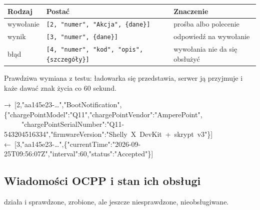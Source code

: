 \documentclass[11pt,a4paper]{article}
\begin{document}
\begin{longtable}{>{\raggedright\arraybackslash}p{3.00cm}>{\raggedright\arraybackslash}p{6.81cm}>{\raggedright\arraybackslash}p{5.47cm}}
\toprule
\rowcolor{apteallight}\textbf{Rodzaj} & \textbf{Postać} & \textbf{Znaczenie} \\
\midrule\endhead
\bottomrule\endfoot
wywołanie & \texttt{[2, "numer", "Akcja", \{dane\}]} & prośba albo polecenie \\
wynik & \texttt{[3, "numer", \{dane\}]} & odpowiedź na wywołanie \\
błąd & \texttt{[4, "numer", "kod", "opis", \{szczegóły\}]} & wywołania nie da się obsłużyć \\
\end{longtable}

Prawdziwa wymiana z testu: ładowarka się przedstawia, serwer ją przyjmuje i każe dawać znak życia co 60 sekund.


\begin{kodbox}
{\symbolfont→}\ [2,"aa145e23-…","BootNotification",\{"chargePointModel":"Q11","chargePointVendor":"AmperePoint",\\
\ \ \ \ \ "chargePointSerialNumber":"Q11-543204516334","firmwareVersion":"Shelly\ X\ DevKit\ +\ skrypt\ v3"\}]\\
{\symbolfont←}\ [3,"aa145e23-…",\{"currentTime":"2026-09-25T09:56:07Z","interval":60,"status":"Accepted"\}]
\end{kodbox}

\subsection{Wiadomości OCPP i stan ich obsługi}

 działa i sprawdzone,  zrobione, ale jeszcze niesprawdzone,  nieobsługiwane.
\end{document}
